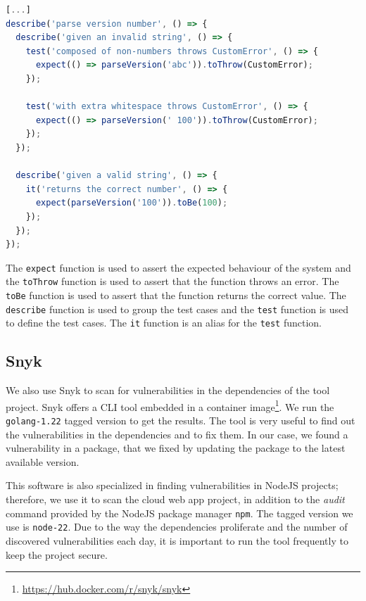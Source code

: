 \noindent\begin{minipage}{\linewidth}
  \vspace{0.5cm}
  \begin{lstlisting}[language=Javascript, caption={Jest testing framework example file parsing.spec.ts}]
[...]
describe('parse version number', () => {
  describe('given an invalid string', () => {
    test('composed of non-numbers throws CustomError', () => {
      expect(() => parseVersion('abc')).toThrow(CustomError);
    });

    test('with extra whitespace throws CustomError', () => {
      expect(() => parseVersion(' 100')).toThrow(CustomError);
    });
  });

  describe('given a valid string', () => {
    it('returns the correct number', () => {
      expect(parseVersion('100')).toBe(100);
    });
  });
});
\end{lstlisting}
\end{minipage}

The \texttt{expect} function is used to assert the expected behaviour of the system and the \texttt{toThrow} function is used to assert that the function throws an error. The \texttt{toBe} function is used to assert that the function returns the correct value. The \texttt{describe} function is used to group the test cases and the \texttt{test} function is used to define the test cases. The \texttt{it} function is an alias for the \texttt{test} function.

\subsection{Snyk}

We also use Snyk to scan for vulnerabilities in the dependencies of the tool project. Snyk offers a CLI tool embedded in a container image\footnote{\url{https://hub.docker.com/r/snyk/snyk}}. We run the \texttt{golang-1.22} tagged version to get the results. The tool is very useful to find out the vulnerabilities in the dependencies and to fix them. In our case, we found a vulnerability in a package, that we fixed by updating the package to the latest available version.

This software is also specialized in finding vulnerabilities in NodeJS projects; therefore, we use it to scan the cloud web app project, in addition to the \textit{audit} command provided by the NodeJS package manager \texttt{npm}. The tagged version we use is \texttt{node-22}. Due to the way the dependencies proliferate and the number of discovered vulnerabilities each day, it is important to run the tool frequently to keep the project secure.

